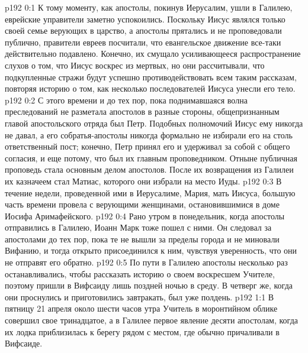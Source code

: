 \author{Комиссия срединников}
\vs p192 0:1 К тому моменту, как апостолы, покинув Иерусалим, ушли в Галилею, еврейские управители заметно успокоились. Поскольку Иисус являлся только своей семье верующих в царство, а апостолы прятались и не проповедовали публично, правители евреев посчитали, что евангельское движение все\hyp{}таки действительно подавлено. Конечно, их смущало усиливающееся распространение слухов о том, что Иисус воскрес из мертвых, но они рассчитывали, что подкупленные стражи будут успешно противодействовать всем таким рассказам, повторяя историю о том, как несколько последователей Иисуса унесли его тело.
\vs p192 0:2 С этого времени и до тех пор, пока поднимавшаяся волна преследований не разметала апостолов в разные стороны, общепризнанным главой апостольского отряда был Петр. Подобных полномочий Иисус ему никогда не давал, а его собратья\hyp{}апостолы никогда формально не избирали его на столь ответственный пост; конечно, Петр принял его и удерживал за собой с общего согласия, и еще потому, что был их главным проповедником. Отныне публичная проповедь стала основным делом апостолов. После их возвращения из Галилеи их казначеем стал Матиас, которого они избрали на место Иуды.
\vs p192 0:3 В течение недели, проведенной ими в Иерусалиме, Мария, мать Иисуса, большую часть времени провела с верующими женщинами, остановившимися в доме Иосифа Аримафейского.
\vs p192 0:4 Рано утром в понедельник, когда апостолы отправились в Галилею, Иоанн Марк тоже пошел с ними. Он следовал за апостолами до тех пор, пока те не вышли за пределы города и не миновали Вифанию, и тогда открыто присоединился к ним, чувствуя уверенность, что они не отправят его обратно.
\vs p192 0:5 По пути в Галилею апостолы несколько раз останавливались, чтобы рассказать историю о своем воскресшем Учителе, поэтому пришли в Вифсаиду лишь поздней ночью в среду. В четверг же, когда они проснулись и приготовились завтракать, был уже полдень.
\vs p192 1:1 В пятницу 21 апреля около шести часов утра Учитель в моронтийном облике совершил свое тринадцатое, а в Галилее первое явление десяти апостолам, когда их лодка приблизилась к берегу рядом с местом, где обычно причаливали в Вифсаиде.
